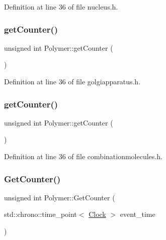 Definition at line 36 of file nucleus.\+h.

\mbox{\label{class_polymer_a8346d821e5f8690d7816ba1d40036b69}} 
\subsubsection{\texorpdfstring{get\+Counter()}{getCounter()}\hspace{0.1cm}{\footnotesize\ttfamily [9/10]}}
{\footnotesize\ttfamily unsigned int Polymer\+::get\+Counter (\begin{DoxyParamCaption}{ }\end{DoxyParamCaption})\hspace{0.3cm}{\ttfamily [inline]}}



Definition at line 36 of file golgiapparatus.\+h.

\mbox{\label{class_polymer_a8346d821e5f8690d7816ba1d40036b69}} 
\subsubsection{\texorpdfstring{get\+Counter()}{getCounter()}\hspace{0.1cm}{\footnotesize\ttfamily [10/10]}}
{\footnotesize\ttfamily unsigned int Polymer\+::get\+Counter (\begin{DoxyParamCaption}{ }\end{DoxyParamCaption})\hspace{0.3cm}{\ttfamily [inline]}}



Definition at line 36 of file combinationmolecules.\+h.

\mbox{\label{class_polymer_ac33903f9b5d2c73d6ddadcb02ece323e}} 
\subsubsection{\texorpdfstring{Get\+Counter()}{GetCounter()}}
{\footnotesize\ttfamily unsigned int Polymer\+::\+Get\+Counter (\begin{DoxyParamCaption}\item[{std\+::chrono\+::time\+\_\+point$<$ \hyperlink{universe_8h_a0ef8d951d1ca5ab3cfaf7ab4c7a6fd80}{Clock} $>$}]{event\+\_\+time }\end{DoxyParamCaption})\hspace{0.3cm}{\ttfamily [inline]}}




